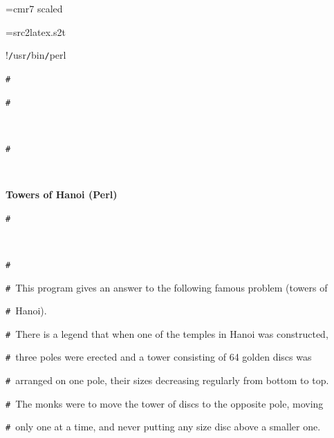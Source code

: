\documentclass{article}
\begin{document}
\ifx\sevenrm\undefined
  \font\sevenrm=cmr7 scaled 
\fi

\newread\MyStyle
\openin\MyStyle=src2latex.s2t
\ifeof\MyStyle
  \closein\MyStyle
\else
  
  \closein\MyStyle
\fi

\def\mc{\relax}
\def\gt{\relax}
\def\sc{\scshape}

\tt\mc 

\noindent
\rm\mc {\tt\#}!{\tt /}usr{\tt /}bin{\tt /}perl

\noindent
\mbox{}{\tt\#}\  \hrulefill  \rm\mc 

\noindent
\mbox{}{\tt\#}
\tt\mc 

\noindent
\mbox{}\rm\mc {\tt\#}\  {}%

\noindent
\mbox{}{\tt\#}
\tt\mc 

\noindent
\mbox{}\rm\mc {\tt\#}\  {}\centerline{\bf Towers of Hanoi (Perl)}  \rm\mc 

\noindent
\mbox{}{\tt\#}
\tt\mc 

\noindent
\mbox{}\rm\mc {\tt\#}\  {}  \rm\mc 

\noindent
\mbox{}{\tt\#}\  {}\hspace{\leftmargini}\noindent  \rm\mc 

\noindent
\mbox{}{\tt\#}\  {}\hspace{\leftmargini}This program gives an answer to the following famous problem (towers of  \rm\mc 

\noindent
\mbox{}{\tt\#}\  {}\hspace{\leftmargini}Hanoi).  \rm\mc 

\noindent
\mbox{}{\tt\#}\  {}\hspace{\leftmargini}There is a legend that when one of the temples in Hanoi was constructed,  \rm\mc 

\noindent
\mbox{}{\tt\#}\  {}\hspace{\leftmargini}three poles were erected and a tower consisting of 64 golden discs was  \rm\mc 

\noindent
\mbox{}{\tt\#}\  {}\hspace{\leftmargini}arranged on one pole, their sizes decreasing regularly from bottom to top.  \rm\mc 

\noindent
\mbox{}{\tt\#}\  {}\hspace{\leftmargini}The monks were to move the tower of discs to the opposite pole, moving  \rm\mc 

\noindent
\mbox{}{\tt\#}\  {}\hspace{\leftmargini}only one at a time, and never putting any size disc above a smaller one.  \rm\mc 
\end{document}
